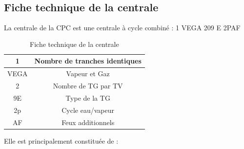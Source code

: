 \subsection{Fiche technique de la centrale}
La centrale de la CPC est une centrale à cycle combiné : 1 VEGA 209 E 2PAF

\begin{table}[h]
\centering
\begin{tabular}{|c|c|}
\hline
1 & Nombre de tranches identiques\\
\hline
VEGA & Vapeur et Gaz\\
\hline
2 & Nombre de TG par TV\\
\hline
9E & Type de la TG\\
\hline
2p & Cycle eau/vapeur\\
\hline
AF & Feux additionnels\\
\hline
\end{tabular}
\caption{Fiche technique de la centrale}
\label{tab:fiche_tech}

\end{table}

Elle est  principalement constituée de :

